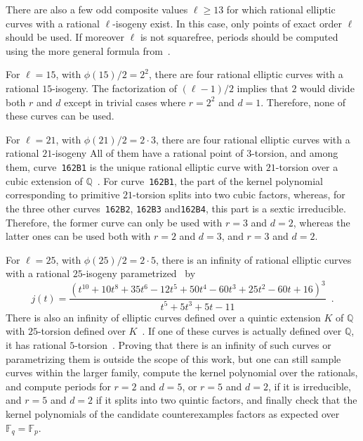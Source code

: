 \documentclass[12pt]{article}
\theoremstyle{plain}
\theoremstyle{definition}
\def\Q{\ensuremath{\mathbb{Q}}}
\def\F{\ensuremath{\mathbb{F}}}
\begin{document}
There are also a few odd composite values $\ell \geq 13$
for which rational elliptic curves with a rational $\ell$-isogeny exist.
In this case, only points of exact order $\ell$ should be used.
If moreover $\ell$ is not squarefree, periods should be computed
using the more general formula from~\cite{feisel1999normal}.


For $\ell = 15$, with $\phi(15)/2 = 2^2$,
there are four rational elliptic curves with a rational $15$-isogeny.
The factorization of $(\ell-1)/2$ implies
that $2$ would divide both $r$ and $d$
except in trivial cases where $r = 2^2$ and $d = 1$.
Therefore, none of these curves can be used.


For $\ell = 21$, with $\phi(21)/2 = 2\cdot3$,
there are four rational elliptic curves with a rational $21$-isogeny
All of them have a rational point of $3$-torsion,
and among them, curve~\texttt{162B1} is the unique rational elliptic curve
with $21$-torsion over a cubic extension of $\Q$~\cite{najman_cubic}.
For curve~\texttt{162B1},
the part of the kernel polynomial corresponding to primitive $21$-torsion
splits into two cubic factors, whereas,
for the three other curves~\texttt{162B2}, \texttt{162B3} and\texttt{162B4},
this part is a sextic irreducible.
Therefore, the former curve can only be used with $r = 3$ and $d = 2$,
whereas the latter ones can be used both with $r = 2$ and $d = 3$,
and $r = 3$ and $d = 2$.

For $\ell = 25$, with $\phi(25)/2 = 2\cdot5$,
there is an infinity of rational elliptic curves
with a rational $25$-isogeny parametrized~\cite{Lozano-Robledo2013} by
\[
j(t) =
\frac{\left(t^{10}+10t^8+35t^6-12t^5+50t^4-60t^3+25t^2-60t+16\right)^3}
{t^5+5t^3+5t-11}\enspace .
\]
There is also an infinity of elliptic curves defined over a quintic
extension $K$ of $\Q$ with $25$-torsion defined over
$K$~\cite{Derickx201452,2016arXiv160807549D}.
If one of these curves is actually defined over $\Q$,
it has rational $5$-torsion~\cite{gonzalez-jimenez_complete_2016}.
Proving that there is an infinity of such curves or
parametrizing them is outside the scope of this work,
but one can still sample curves within the larger family,
compute the kernel polynomial over the rationals,
and compute periods for $r = 2$ and $d = 5$, or $r = 5$ and $d = 2$,
if it is irreducible,
and $r = 5$ and $d = 2$ if it splits into two quintic factors,
and finally check that the kernel polynomials of the candidate counterexamples
factors as expected over $\F_q = \F_p$.
\end{document}
